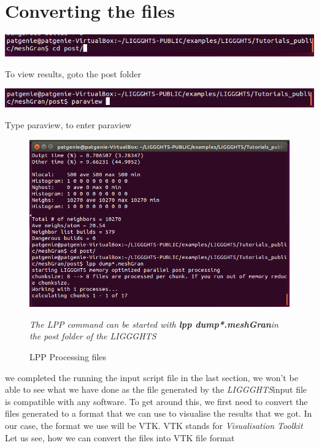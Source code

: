 \documentclass{tufte-book} %
\newcommand{\Li}{\textit{LIGGGHTS}}
\begin{document}
 \section[Converting the files]{Converting the files}
 \begin{marginfigure}
   \includegraphics[width=\linewidth]{graphics/Screenshot/Con1.png}
   \caption{To view results, goto the post folder}
  
   \includegraphics[width=\linewidth]{graphics/Screenshot/Con4.png}
   \caption{Type paraview, to enter paraview}
 \end{marginfigure}
 \begin{figure}
 \includegraphics[width=\linewidth]{graphics/Screenshot/Con2.png}
 \caption{LPP Processing files}
 \textit{The LPP command can be started with \textbf{lpp dump*.meshGran}in the post folder of the \Li}
 \end{figure}
 \begin{fullwidth}
    we completed the running the input script file in the last section, we won't be able to see what we have done as the file generated by the \Li input file is compatible with any software. To get around this, we first need to convert the files generated to a format that we can use to visualise the results that we got. In our case, the format we use will be VTK. VTK stands for \textit{Visualisation Toolkit}
   Let us see, how we can convert the files into VTK file format
 \end{fullwidth}
\end{document}
